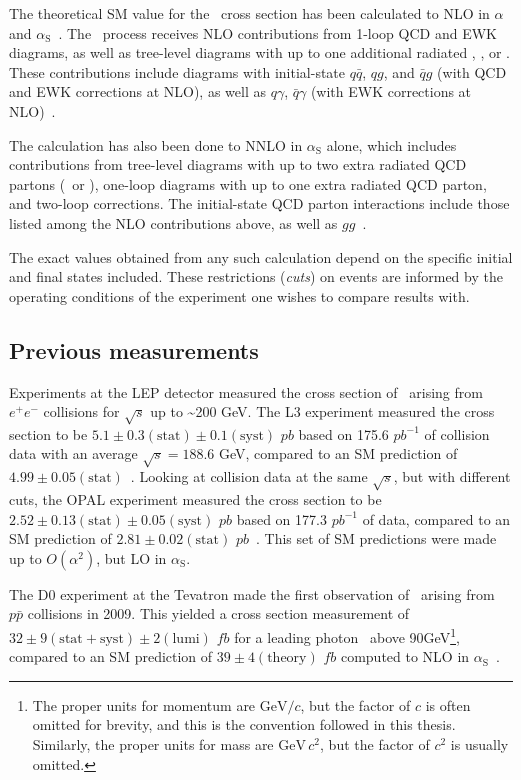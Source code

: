 \documentclass[oneside, letterpaper, 12pt, oldfontcommands]{memoir}
\begin{document}
The theoretical SM value for the \zinvg\ cross section has been calculated to NLO in $\alpha$ and $\alpha_\mathrm{S}$~\cite{ref:JHEP04(2015)018, ref:JHEP02(2016)057}.
The \zinvg\ process receives NLO contributions from 1-loop QCD and EWK diagrams, as well as tree-level diagrams with up to one additional radiated \Pgamma, \Pq, or \Pg.
These contributions include diagrams with initial-state $q\bar{q}$, $qg$, and $\bar{q}g$ (with QCD and EWK corrections at NLO), as well as $q\gamma$, $\bar{q}\gamma$ (with EWK corrections
at NLO)~\cite{ref:JHEP02(2016)057}.

The calculation has also been done to NNLO in $\alpha_\mathrm{S}$ alone,
which includes contributions from tree-level diagrams with up to two extra radiated QCD partons (\Pq\ or \Pg), one-loop diagrams with up to one extra
radiated QCD parton, and two-loop corrections. The initial-state QCD parton interactions include those listed among the NLO contributions above,
as well as $gg$~\cite{ref:j.physletb.2014.02.037, ref:JHEP07(2015)085}.

The exact values obtained from any such calculation depend on the specific initial and final states included. These restrictions (\textit{cuts}) on events are
informed by the operating conditions of the experiment one wishes to compare results with.

\subsection{Previous measurements} \label{sec:introduction_znng_previous_measurements}
Experiments at the LEP detector measured the cross section of \zinvg\ arising from $e^{\mathrm{+}}e^{\mathrm{-}}$ collisions for $\sqrt{s}$ up to \textasciitilde200 GeV.
The L3 experiment measured the cross section to be $5.1 \pm 0.3\mathrm{(stat)} \pm 0.1\mathrm{(syst)}$ $pb$ based on 175.6 $pb^{-1}$ of collision data with an average $\sqrt{s} = 188.6$ GeV, compared to an SM
prediction of $4.99 \pm 0.05\mathrm{(stat)}$~\cite{ref:j.physletb.2004.07.002}. Looking at collision data at the same $\sqrt{s}$, but with different cuts,
the OPAL experiment measured the cross section to be $2.52 \pm 0.13\mathrm{(stat)} \pm 0.05\mathrm{(syst)}$ $pb$ based on 177.3 $pb^{-1}$ of data, compared to an SM
prediction of $2.81 \pm 0.02\mathrm{(stat)}$ $pb$~\cite{}. This set of SM predictions were made up to $O(\alpha^2)$, but LO in $\alpha_\mathrm{S}$.

The D0 experiment at the Tevatron made the first observation of \zinvg\ arising from $p\bar{p}$ collisions in 2009. This yielded a cross section measurement of
$32 \pm 9\mathrm{(stat+syst)} \pm 2\mathrm{(lumi)}$ $fb$ for a leading photon \pT\ above 90\unit{GeV}\footnote{The proper units for momentum are $\mathrm{GeV}/c$, but the
factor of $c$ is often omitted for brevity, and this is the convention followed in this thesis. Similarly, the proper units for mass are $\mathrm{GeV}\,c^{2}$, but the factor
of $c^{2}$ is usually omitted.},
compared to an SM prediction of $39 \pm 4\mathrm{(theory)}$ $fb$ computed to NLO in $\alpha_\mathrm{S}$~\cite{ref:PhysRevLett.102.201802}.
\end{document}
